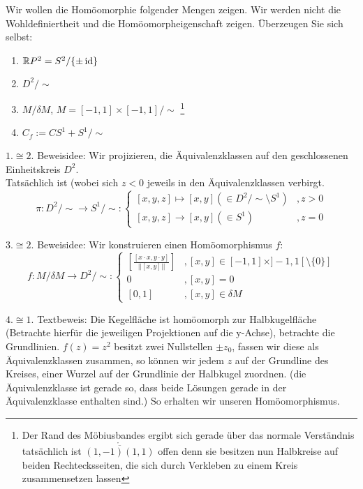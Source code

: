 \documentclass{scrartcl}
\newcommand{\id}{\operatorname{id}}
\newcommand{\homo}{\cong}
\begin{document}
\begin{aufgabe}
Wir wollen die Homöomorphie folgender Mengen zeigen. Wir werden nicht die Wohldefiniertheit und die Homöomorpheigenschaft zeigen. Überzeugen Sie sich selbst:
\begin{enumerate}
\item $\R P^2=S^2/\{\pm \id\}$
\item $ D^2/\sim $
\item $ M/\delta M $, $ M=[-1,1]\times[-1,1]/\sim $
\footnote{Der Rand des Möbiusbandes ergibt sich gerade über das normale Verständnis tatsächlich ist 
$ \mathring {\overline{(1,-1)(1,1)}}$ 
offen denn sie besitzen nun Halbkreise auf beiden Rechtecksseiten, die sich durch Verkleben zu einem Kreis zusammensetzen lassen}
\item $ C_f:=CS^1+S^1/\sim $
\end{enumerate}
\begin{seg}{$1. \homo 2. $}
Beweisidee: Wir projizieren, die Äquivalenzklassen auf den geschlossenen Einheitskreis $ D^2 $.\\
Tatsächlich ist (wobei sich $ z<0 $ jeweils in den Äquivalenzklassen verbirgt.
\[
 \pi:D^2/\sim \to S^1/\sim: \begin{cases}[x,y,z]\mapsto [x,y](\in D^2/\sim\setminus S^1)&, z> 0\\ [x,y, z]\to [x,y](\in S^1)&, z =0  \end{cases} 
\]
\end{seg}
\begin{seg}{$3. \homo 2. $}
Beweisidee: Wir konstruieren einen Homöomorphismus $ f $:
\[
f: M/\delta M \to D^2/\sim: \begin{cases} \left[\frac{[x\cdot x,y\cdot y]}{||[x,y]||}\right]&, [x,y]\in [-1,1]\times]-1,1[\setminus\{0\}]\\ 0&, [x,y]=0\\ [0,1]&, [x,y]\in \delta M  \end{cases}
\]
\end{seg}
\begin{seg}{$ 4. \homo 1. $}
Textbeweis: Die Kegelfläche ist homöomorph zur Halbkugelfläche (Betrachte hierfür die jeweiligen Projektionen auf die y-Achse),  betrachte die Grundlinien. $ f(z)=z^2 $ besitzt zwei Nullstellen $ \pm z_0 $, fassen wir diese als Äquivalenzklassen zusammen, so können wir jedem $ z $ auf der Grundline des Kreises, einer Wurzel auf der Grundlinie der Halbkugel zuordnen. (die Äquivalenzklasse ist gerade so, dass beide Lösungen  gerade in der Äquivalenzklasse enthalten sind.) So erhalten wir unseren Homöomorphismus.  
\end{seg}
\end{aufgabe}
\end{document}
